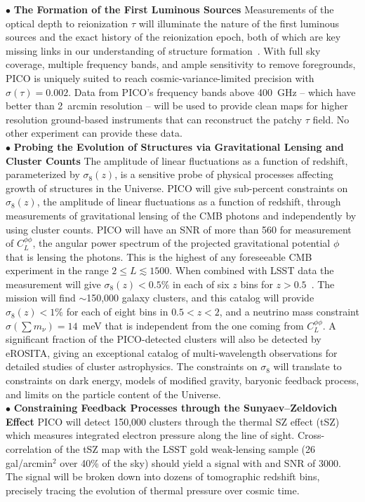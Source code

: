 \documentclass[PICOAPC.tex]{subfiles}
\begin{document}
 
$\bullet$ {\bf The Formation of the First Luminous Sources} \hspace{0.1in} \label{sec:luminoussources}  Measurements of the optical depth to reionization $\tau$ will illuminate the nature of the first luminous sources and the exact history of the reionization epoch, both of which are key missing links in our understanding of structure formation~\citep{alvarez_swp}.  With full sky coverage, multiple frequency bands, and ample sensitivity to remove foregrounds, PICO is uniquely suited to reach cosmic-variance-limited precision with $\sigma(\tau)=0.002$. Data from PICO's frequency bands above 400~GHz -- which have better than 2~arcmin resolution  -- will be used to provide clean maps for higher resolution ground-based instruments that can reconstruct the patchy $\tau$ field. No other experiment can provide these data. \\
%
$\bullet$ {\bf Probing the Evolution of Structures via Gravitational Lensing and Cluster Counts} \hspace{0.1in} \label{sec:gravitationallensing}   
The amplitude of linear fluctuations as a function of redshift, parameterized by $\sigma_8(z)$, is a sensitive probe of physical processes affecting growth of structures in the Universe. PICO will give sub-percent constraints on $\sigma_8(z)$, the amplitude of linear fluctuations as a function of redshift, through measurements of gravitational lensing of the CMB photons and independently by using cluster counts. 
PICO will have an \ac{SNR} of more than 560 for measurement of $C_{L}^{\phi \phi}$, the angular power spectrum of the projected gravitational potential $\phi$ that is lensing the photons. This is the highest of any foreseeable CMB experiment in the range $2 \leq L \lesssim 1500$. When combined with LSST data the measurement will give $\sigma_8(z) <0.5\%$ in each of six $z$ bins for $z>0.5$~\cite{pico_report}.
The mission will find $\sim$150,000 galaxy clusters, and this catalog will provide $\sigma_{8}(z) < 1\%$ for each of eight bins in $0.5 < z < 2$, and a neutrino mass constraint $\sigma(\sum m_{\nu}) = 14$~meV that is independent from the one coming from $C_{L}^{\phi \phi}$. A significant fraction of the PICO-detected clusters will also be detected by eROSITA, giving an exceptional catalog of multi-wavelength observations for detailed studies of cluster astrophysics. The constraints on $\sigma_{8}$ will translate to constraints on dark energy, models of modified gravity, baryonic feedback process, and limits on the particle content of the Universe. \\
%
$\bullet$ {\bf Constraining Feedback Processes through the Sunyaev--Zeldovich Effect} \hspace{0.1in} \label{sec:sz}
PICO will detect 150,000 clusters through the thermal SZ effect (tSZ) which measures integrated electron pressure along the line of sight.  Cross-correlation of the tSZ map with the LSST gold weak-lensing sample (26 gal/arcmin$^2$ over 40\% of the sky) should yield a signal with and \ac{SNR} of 3000.  The signal will be broken down into dozens of tomographic redshift bins, precisely tracing the evolution of thermal pressure over cosmic time.
\end{document}
